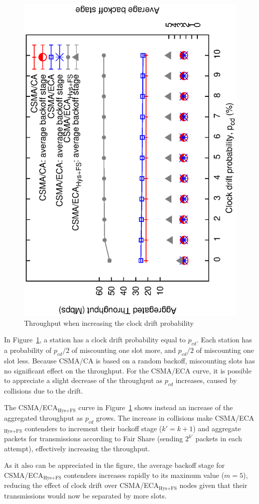 \documentclass[a4paper,journal]{IEEEtran}
\begin{document}
	\begin{figure}[tb]
	\centering
		\includegraphics[width=0.7\linewidth,angle=-90]{figures/clockDrift/throughput_and_BOS_w_SD.eps}
		\caption{Throughput when increasing the clock drift probability}
		\label{fig:clockDrift}
	\end{figure}
	
	In Figure~\ref{fig:clockDrift}, a station has a clock drift probability equal to $p_{cd}$. Each station has a probability of $p_{cd}/2$ of miscounting one slot more, and $p_{cd}/2$ of miscounting one slot less. Because CSMA/CA is based on a random backoff, miscounting slots has no significant effect on the throughput. For the CSMA/ECA curve, it is possible to appreciate a slight decrease of the throughput as $p_{cd}$ increases, caused by collisions due to the drift.
	
	The CSMA/ECA$_{\text{Hys+FS}}$ curve in Figure~\ref{fig:clockDrift} shows instead an increase of the aggregated throughput as $p_{cd}$ grows. The increase in collisions make CSMA/ECA$_{\text{Hys+FS}}$ contenders to increment their backoff stage ($k'=k+1$) and aggregate packets for transmissions according to Fair Share (sending $2^{k'}$ packets in each attempt), effectively increasing the throughput. 
	
	As it also can be appreciated in the figure, the average backoff stage for CSMA/ECA$_{\text{Hys+FS}}$ contenders increases rapidly to its maximum value ($m=5$), reducing the effect of clock drift over CSMA/ECA$_{\text{Hys+FS}}$ nodes given that their transmissions would now be separated by more slots.	\\
\end{document}

